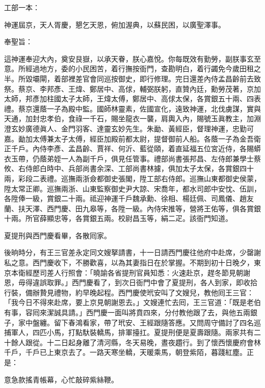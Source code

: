\begin{myquote}[\markfont]
工部一本：

神運屆京，天人胥慶，懇乞天恩，俯加渥典，以蘇民困，以廣聖澤事。

奉聖旨：

這神運奉迎大內，奠安艮嶽，以承天眷，朕心嘉悅。你每既效有勤勞，副朕事玄至意。所經過地方，委的小民困苦，着行撫按衙門，查勘明白，着行蠲免今歲田租之半。所毀壩閘，着部裡差官會同巡按御史，即行修理。完日還差內侍孟昌齡前去致祭。蔡京、李邦彥、王煒、鄭居中、高俅，輔弼朕躬，直贊內廷，勳勞茂著，京加太師，邦彥加柱國太子太師，王煒太傅，鄭居中、高俅太保，各賞銀五十兩、四表禮。蔡京還蔭一子為殿中監。國師林靈素，佐國宣化，遠致神運，北伐虜謀，實與天通，加封忠孝伯，食祿一千石，賜坐龍衣一襲，肩輿入內，賜號玉眞教主，加淵澄玄妙廣德眞人、金門羽客、達靈玄妙先生。{}朱勔、黃經臣，督理神運，忠勤可嘉。勔加太傅兼太子太傅，經臣加殿前都太尉，提督御前人船。各蔭一子為金吾衛正千戶。內侍李彥、孟昌齡、賈祥、何沂、藍從頤，着直延福五位宮近侍，各賜蟒衣玉帶，仍蔭弟姪一人為副千戶，俱見任管事。禮部尚書張邦昌、左侍郎兼學士蔡攸、右侍郎白時中、兵部尚書余深、工部尚書林攄，俱加太子太保，各賞銀四十兩，彩段二表禮。巡撫兩浙僉都御史張閣，陞工部右侍郎。巡撫山東都御史侯蒙，陞太常正卿。巡撫兩浙、山東監察御史尹大諒、宋喬年，都水司郎中安忱、伍訓，各陞俸一級，賞銀二十兩。祗迎神運千戶魏承勳、徐相、楊廷佩、司鳳儀、趙友蘭、扶天澤、西門慶、田九皋等，各陞一級。內侍宋推等，營將王佑等，俱各賞銀十兩。所官薛顯忠等，各賞銀五兩。校尉昌玉等，絹二疋。該衙門知道。
\end{myquote} 

夏提刑與西門慶看畢，各散囘家。

後晌時分，有王三官差永定同文嫂拏請書，十一日請西門慶往他府中赴席，少罄謝私之意。西門慶收下，不勝歡喜，以為其妻指日在於掌握。{}不期到初十日晚夕，東京本衛經歷司差人行照會：「曉諭各省提刑官員知悉：火速赴京，趕冬節見朝謝恩，毋得違誤取罪。」西門慶看了，到次日衙門中會了夏提刑，各人到家，即收拾行裝，備辦贄見禮物，約早晚起程。西門慶使玳安叫了文嫂兒，教他囘王三官：「我今日不得來赴席，要上京見朝謝恩去。」文嫂連忙去囘，王三官道：「既是老伯有事，容囘來潔誠具請。」西門慶一面叫將賁四來，分付教他跟了去，與他五兩銀子，家中盤纏。留下春鴻看家，帶了玳安、王經跟隨答應。又問周守備討了四名巡捕軍人，四匹小馬，打點馱裝轎馬，排軍擡扛。夏提刑便是夏壽跟隨。兩家共有二十餘人跟從。十二日起身離了清河縣，冬天易晚，晝夜趲行。到了懷西懷慶府會林千戶，千戶已上東京去了。一路天寒坐轎，天暖乘馬，朝登紫陌，暮踐紅塵。正是：

\begin{myquote}
意急款搖青帳幕，心忙敲碎紫絲鞭。
\end{myquote}

